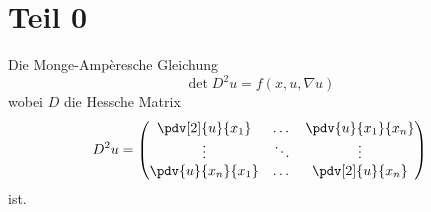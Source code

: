 %
%
%
%
\section{Teil 0\label{mongeampere:section:teil0}}
Die Monge-Ampèresche Gleichung
\begin{equation}
  \det D^2 u = f(x, u, \nabla u)
  \label{mongeampere:eq:mongeampere}
\end{equation}
wobei $D$ die Hessche Matrix
\begin{equation}
  D^2 u =
  \begin{pmatrix}
    \pdv[2]{u}{x_1} & \dots &\pdv{u}{x_1}{x_n} \\
  \vdots & \ddots & \vdots \\
  \pdv{u}{x_n}{x_1} & \dots &\pdv[2]{u}{x_n} \\
  \end{pmatrix}
  \label{mongeampere:eq:hess}
\end{equation}
ist.

